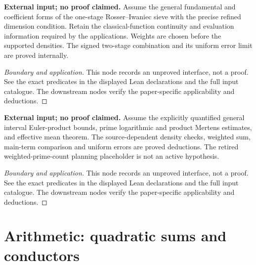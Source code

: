 \begin{lemma}
\label{input_sieve}
\uses{}
\textbf{External input; no proof claimed.} Assume the general fundamental and coefficient forms of the one-stage Rosser--Iwaniec sieve with the precise refined dimension condition. Retain the classical-function continuity and evaluation information required by the applications. Weights are chosen before the supported densities. The signed two-stage combination and its uniform error limit are proved internally.
\end{lemma}
\begin{proof}[Boundary and application]
\uses{}
This node records an unproved interface, not a proof. See the exact predicates in the displayed Lean declarations and the full input catalogue. The downstream nodes verify the paper-specific applicability and deductions.
\end{proof}

\begin{lemma}
\label{input_mertens_mean}
\uses{}
\textbf{External input; no proof claimed.} Assume the explicitly quantified general interval Euler-product bounds, prime logarithmic and product Mertens estimates, and effective mean theorem. The source-dependent density checks, weighted sum, main-term comparison and uniform errors are proved deductions. The retired weighted-prime-count planning placeholder is not an active hypothesis.
\end{lemma}
\begin{proof}[Boundary and application]
\uses{}
This node records an unproved interface, not a proof. See the exact predicates in the displayed Lean declarations and the full input catalogue. The downstream nodes verify the paper-specific applicability and deductions.
\end{proof}

\section{Arithmetic: quadratic sums and conductors}


